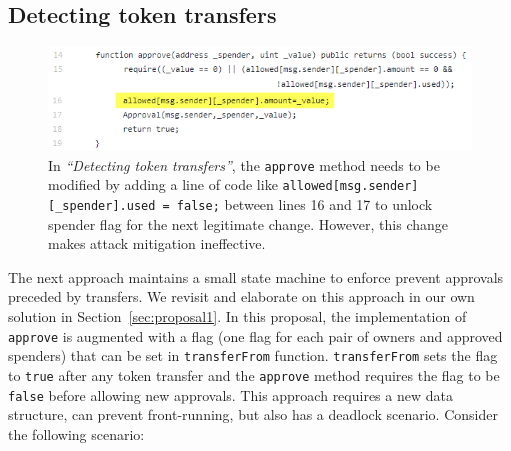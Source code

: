 


\subsection{Detecting token transfers}

\begin{figure}[t]
	\centering
	\includegraphics[width=1.0\linewidth]{figures/multiple_withdrawal_33.png}
	\caption{In \textit{``Detecting token transfers''}, the \texttt{approve} method needs to be modified by adding a line of code like \texttt{allowed[msg.sender][\_spender].used = false;} between lines 16 and 17 to unlock spender flag for the next legitimate change. However, this change makes attack mitigation ineffective.\label{fig:det}}
\end{figure}

The next approach \cite{Ref17} maintains a small state machine to enforce prevent approvals preceded by transfers. We revisit and elaborate on this approach in our own solution in Section~\ref{sec:proposal1}. In this proposal, the implementation of \texttt{approve} is augmented with a flag (one flag for each pair of owners and approved spenders) that can be set in \texttt{transferFrom} function. \texttt{transferFrom} sets the flag to \texttt{true} after any token transfer and the \texttt{approve} method requires the flag to be \texttt{false} before allowing new approvals. This approach requires a new data structure, can prevent front-running, but also has a deadlock scenario. Consider the following scenario:

